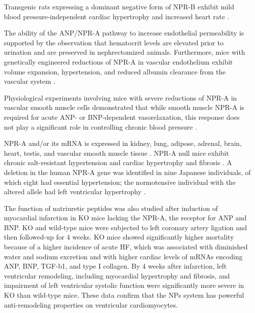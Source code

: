\documentclass[14pt,a4paper,onecolumn]{extarticle}
\begin{document}

Transgenic rats expressing a dominant negative form of NPR-B exhibit mild blood pressure-independent cardiac hypertrophy and increased heart rate \citep{Langenickel2006}. %

The ability of the ANP/NPR-A pathway to increase  endothelial permeability is supported by the observation that hematocrit levels are elevated prior to urination and are preserved in nephrectomized animals.  Furthermore, mice with genetically engineered reductions of NPR-A in vascular endothelium exhibit volume expansion, hypertension, and reduced albumin clearance from the vascular system \citep{Sabrane2005}. %

Physiological experiments involving mice with severe reductions of NPR-A in vascular smooth muscle cells demonstrated that while smooth muscle NPR-A is required for acute ANP- or BNP-dependent vasorelaxation, this response does not play a significant role in controlling chronic blood pressure \citep{Holtwick2002}. %

NPR-A and/or its mRNA is expressed in kidney, lung, adipose, adrenal, brain, heart, testis, and vascular smooth muscle tissue \citep{Goy2001}. NPR-A null mice exhibit chronic salt-resistant hypertension and cardiac hypertrophy and fibrosis \citep{Kuhn2002}.  A deletion in the human NPR-A gene was identified in nine Japanese individuals, of which eight had essential hypertension; the normotensive individual with the altered allele had left ventricular hypertrophy \citep{Nakayama2000}. %

The function of natriuretic peptides was also studied after induction of myocardial infarction in KO mice lacking the NPR-A, the receptor for ANP and BNP. KO and wild-type mice were subjected to left coronary artery ligation and then followed-up for 4 weeks. KO mice showed significantly higher mortality because of a higher incidence of acute HF, which was associated with diminished water and sodium excretion and with higher cardiac levels of mRNAs encoding ANP, BNP, TGF-b1, and type I collagen. By 4 weeks after infarction, left ventricular remodeling, including myocardial hypertrophy and fibrosis, and impairment of left ventricular systolic function were significantly more severe in KO than wild-type mice. These data confirm that the NPs system has powerful anti-remodeling properties on ventricular cardiomyocytes.\citep{89} %
\end{document}
